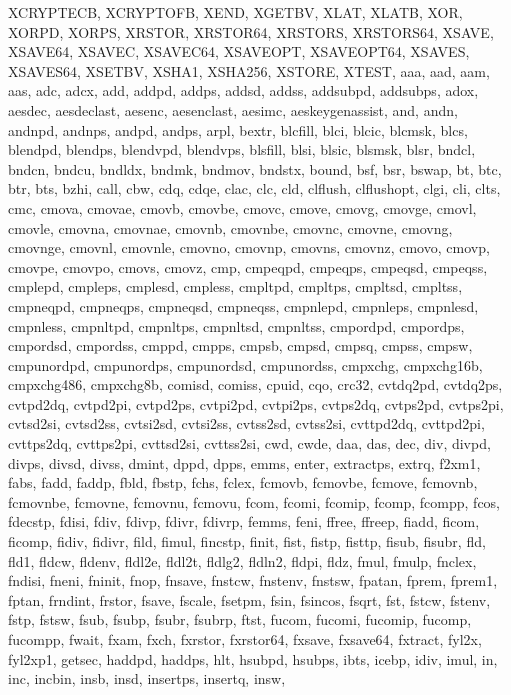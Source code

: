 {{XCRYPTECB, XCRYPTOFB, XEND, XGETBV, XLAT, XLATB, XOR, XORPD, XORPS, XRSTOR,
XRSTOR64, XRSTORS, XRSTORS64, XSAVE, XSAVE64, XSAVEC, XSAVEC64, XSAVEOPT,
XSAVEOPT64, XSAVES, XSAVES64, XSETBV, XSHA1, XSHA256, XSTORE, XTEST,
aaa, aad, aam, aas, adc, adcx, add, addpd, addps, addsd, addss, addsubpd,
addsubps, adox, aesdec, aesdeclast, aesenc, aesenclast, aesimc, aeskeygenassist,
and, andn, andnpd, andnps, andpd, andps, arpl, bextr, blcfill, blci, blcic,
blcmsk, blcs, blendpd, blendps, blendvpd, blendvps, blsfill, blsi, blsic,
blsmsk, blsr, bndcl, bndcn, bndcu, bndldx, bndmk, bndmov, bndstx, bound, bsf,
bsr, bswap, bt, btc, btr, bts, bzhi, call, cbw, cdq, cdqe, clac, clc, cld,
clflush, clflushopt, clgi, cli, clts, cmc, cmova, cmovae, cmovb, cmovbe, cmovc,
cmove, cmovg, cmovge, cmovl, cmovle, cmovna, cmovnae, cmovnb, cmovnbe, cmovnc,
cmovne, cmovng, cmovnge, cmovnl, cmovnle, cmovno, cmovnp, cmovns, cmovnz, cmovo,
cmovp, cmovpe, cmovpo, cmovs, cmovz, cmp, cmpeqpd, cmpeqps, cmpeqsd, cmpeqss,
cmplepd, cmpleps, cmplesd, cmpless, cmpltpd, cmpltps, cmpltsd, cmpltss,
cmpneqpd, cmpneqps, cmpneqsd, cmpneqss, cmpnlepd, cmpnleps, cmpnlesd, cmpnless,
cmpnltpd, cmpnltps, cmpnltsd, cmpnltss, cmpordpd, cmpordps, cmpordsd, cmpordss,
cmppd, cmpps, cmpsb, cmpsd, cmpsq, cmpss, cmpsw, cmpunordpd, cmpunordps,
cmpunordsd, cmpunordss, cmpxchg, cmpxchg16b, cmpxchg486, cmpxchg8b, comisd,
comiss, cpuid, cqo, crc32, cvtdq2pd, cvtdq2ps, cvtpd2dq, cvtpd2pi, cvtpd2ps,
cvtpi2pd, cvtpi2ps, cvtps2dq, cvtps2pd, cvtps2pi, cvtsd2si, cvtsd2ss, cvtsi2sd,
cvtsi2ss, cvtss2sd, cvtss2si, cvttpd2dq, cvttpd2pi, cvttps2dq, cvttps2pi,
cvttsd2si, cvttss2si, cwd, cwde, daa, das, dec, div, divpd, divps, divsd, divss,
dmint, dppd, dpps, emms, enter, extractps, extrq, f2xm1, fabs, fadd, faddp,
fbld, fbstp, fchs, fclex, fcmovb, fcmovbe, fcmove, fcmovnb, fcmovnbe, fcmovne,
fcmovnu, fcmovu, fcom, fcomi, fcomip, fcomp, fcompp, fcos, fdecstp, fdisi, fdiv,
fdivp, fdivr, fdivrp, femms, feni, ffree, ffreep, fiadd, ficom, ficomp, fidiv,
fidivr, fild, fimul, fincstp, finit, fist, fistp, fisttp, fisub, fisubr, fld,
fld1, fldcw, fldenv, fldl2e, fldl2t, fldlg2, fldln2, fldpi, fldz, fmul, fmulp,
fnclex, fndisi, fneni, fninit, fnop, fnsave, fnstcw, fnstenv, fnstsw, fpatan,
fprem, fprem1, fptan, frndint, frstor, fsave, fscale, fsetpm, fsin, fsincos,
fsqrt, fst, fstcw, fstenv, fstp, fstsw, fsub, fsubp, fsubr, fsubrp, ftst, fucom,
fucomi, fucomip, fucomp, fucompp, fwait, fxam, fxch, fxrstor, fxrstor64, fxsave,
fxsave64, fxtract, fyl2x, fyl2xp1, getsec, haddpd, haddps, hlt, hsubpd, hsubps,
ibts, icebp, idiv, imul, in, inc, incbin, insb, insd, insertps, insertq, insw,
}}
